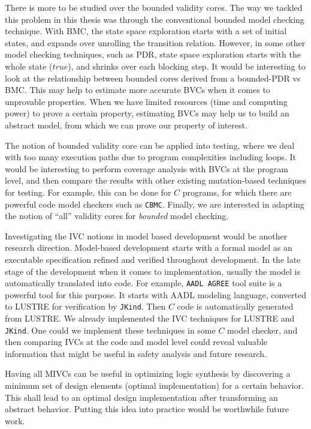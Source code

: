 There is more to be studied over the bounded validity cores. The way we tackled this problem in this thesis was through the conventional bounded model checking technique. With BMC, the state space exploration starts with a set of initial states, and expands over unrolling the transition relation. However, in some other model checking techniques, such as PDR, state space exploration starts with the whole state ($true$), and shrinks over each blocking step. It would be interesting to look at the relationship between bounded cores derived from a bounded-PDR vs BMC. This may help to estimate more accurate BVCs when it comes to unprovable properties. When we have limited resources (time and computing power) to prove a certain property, estimating BVCs may help us to build an abstract model, from which we can prove our property of interest.

The notion of bounded validity core can be applied into testing, where we deal with too many execution paths due to program complexities including loops. It would be interesting to perform coverage analysis with BVCs at the program level, and then compare the results with other existing mutation-based techniques for testing. For example, this can be done for $C$ programs, for which there are powerful code model checkers such as \texttt{CBMC}. Finally, we are interested in adapting the notion of ``all'' validity cores for \emph{bounded} model checking.

Investigating the IVC notions in model based development would be another research direction. Model-based development starts with a formal model as an executable specification refined and verified throughout development. In the late stage of the development when it comes to implementation, usually the model is automatically translated into code. For example,  \texttt{AADL AGREE} tool suite is a powerful tool for this purpose. It starts with AADL modeling language, converted to LUSTRE for verification by \texttt{JKind}. Then $C$ code is automatically generated from LUSTRE. We already implemented the IVC techniques for LUSTRE and \texttt{JKind}. One could we implement these techniques in some $C$ model checker, and then comparing IVCs at the code and model level could reveal valuable information that might be useful in safety analysis and future research.

Having all MIVCs can be useful in optimizing logic synthesis by discovering a minimum set of design elements (optimal implementation) for a certain behavior. This shall lead to an optimal design implementation after transforming an abstract behavior. Putting this idea into practice would be worthwhile future work.


